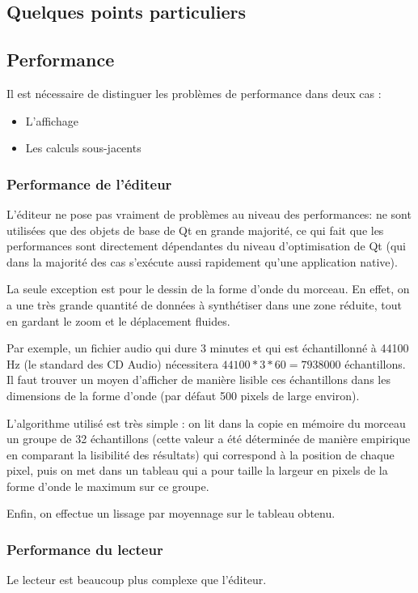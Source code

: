 \documentclass[a4paper,11pt]{article}
\begin{document}
\subsection{Quelques points particuliers}


\subsection{Performance}
Il est nécessaire de distinguer les problèmes de performance dans deux cas :

\begin{itemize}
	\item L'affichage
	\item Les calculs sous-jacents
\end{itemize}

\subsubsection{Performance de l'éditeur}
L'éditeur ne pose pas vraiment de problèmes au niveau des performances: ne sont utilisées que des
objets de base de Qt en grande majorité, ce qui fait que les performances sont directement dépendantes du niveau
d'optimisation de Qt (qui dans la majorité des cas s'exécute aussi rapidement qu'une application native).

La seule exception est pour le dessin de la forme d'onde du morceau. En effet, on a une très grande quantité de données à synthétiser dans
une zone réduite, tout en gardant le zoom et le déplacement fluides.

Par exemple, un fichier audio qui dure 3 minutes et qui est échantillonné à 44100 Hz (le standard des CD Audio)
nécessitera $44100 * 3 * 60 = 7938000$ échantillons. Il faut trouver un moyen d'afficher de manière lisible ces
échantillons dans les dimensions de la forme d'onde (par défaut 500 pixels de large environ).

L'algorithme utilisé est très simple : on lit dans la copie en mémoire du morceau un groupe de 32 échantillons
(cette valeur a été déterminée de manière empirique en comparant la lisibilité des résultats) qui correspond à la position de
chaque pixel, puis on met dans un tableau qui a pour taille la largeur en pixels de la forme d'onde le maximum sur ce groupe.

Enfin, on effectue un lissage par moyennage sur le tableau obtenu.

\subsubsection{Performance du lecteur}
Le lecteur est beaucoup plus complexe que l'éditeur.
\end{document}
